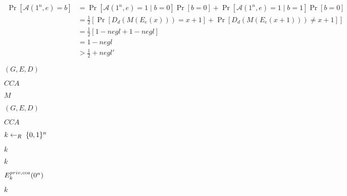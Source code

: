 \documentclass[10pt]{book}
\begin{document}
\begin{mdSnippets}
\begin{mdDisplaySnippet}[10c8ac5ffc133bb4514f977197c5787c]
\[%
\begin{aligned}
\Pr[\mathcal{A}(1^n,e) = b] &= \Pr[\mathcal{A}(1^n,e) = 1 \mid b = 0]\Pr[b = 0] + \Pr[\mathcal{A}(1^n,e) =1 \mid b = 1]\Pr[b = 0] \\
&= \frac{1}{2}[\Pr[D_d(M(E_e(x))) = x + 1] + \Pr[D_d(M(E_e(x+1))) \neq x + 1]] \\
&= \frac{1}{2}[1 - negl + 1 - negl] \\
&= 1 - negl \\
&> \frac{1}{2} + negl'
\end{aligned}
\]%
\end{mdDisplaySnippet}%
\begin{mdInlineSnippet}[b85e5fef323d7d3cb0465e35e6d6d405]%
$(G,E,D)$\end{mdInlineSnippet}%
\begin{mdInlineSnippet}[d8c072a439c55274f145eae9f6583751]%
$CCA$\end{mdInlineSnippet}%
\begin{mdInlineSnippet}[69691c7bdcc3ce6d5d8a1361f22d04ac]%
$M$\end{mdInlineSnippet}%
\begin{mdInlineSnippet}[b85e5fef323d7d3cb0465e35e6d6d405]%
$(G,E,D)$\end{mdInlineSnippet}%
\begin{mdInlineSnippet}[d8c072a439c55274f145eae9f6583751]%
$CCA$\end{mdInlineSnippet}%
\begin{mdInlineSnippet}[ddb420b47c1d9e702170664f39a03cf2]%
$k \leftarrow_R\;\{0,1\}^n$\end{mdInlineSnippet}%
\begin{mdInlineSnippet}[8ce4b16b22b58894aa86c421e8759df3]%
$k$\end{mdInlineSnippet}%
\begin{mdInlineSnippet}[8ce4b16b22b58894aa86c421e8759df3]%
$k$\end{mdInlineSnippet}%
\begin{mdInlineSnippet}%
$E^{priv,cca}_k(0^n)$\end{mdInlineSnippet}%
\begin{mdInlineSnippet}[8ce4b16b22b58894aa86c421e8759df3]%
$k$\end{mdInlineSnippet}%

\end{mdSnippets}
\end{document}

